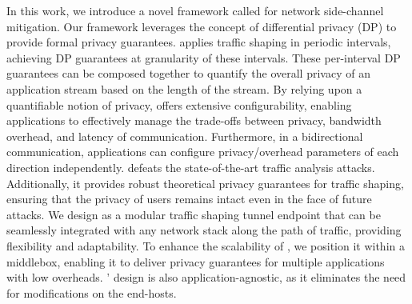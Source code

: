 In this work, we introduce a novel framework called {\sys} for network side-channel mitigation.
Our framework leverages the concept of differential privacy (DP) to provide formal privacy guarantees.
{\sys} applies traffic shaping in periodic intervals, achieving DP guarantees at granularity of these intervals. 
These per-interval DP guarantees can be composed together to quantify the overall privacy of an application stream based on the length of the stream.
By relying upon a quantifiable notion of privacy, {\sys} offers extensive configurability, enabling applications to effectively manage the trade-offs between privacy, bandwidth overhead, and latency of communication.
Furthermore, in a bidirectional communication, applications can configure privacy/overhead parameters of each direction independently.
{\sys} defeats the state-of-the-art traffic analysis attacks.
Additionally, it provides robust theoretical privacy guarantees for traffic shaping, ensuring that the privacy of users remains intact even in the face of future attacks.
We design {\sys} as a modular traffic shaping tunnel endpoint that can be seamlessly integrated with any network stack along the path of traffic, providing flexibility and adaptability.
To enhance the scalability of {\sys}, we position it within a middlebox, enabling it to deliver privacy guarantees for multiple applications with low overheads. 
{\sys}' design is also application-agnostic, as it eliminates the need for modifications on the end-hosts. 







